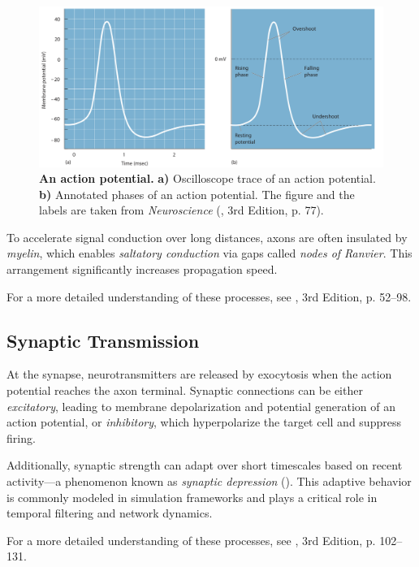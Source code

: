 \begin{figure}
    \centering
    \includegraphics[width=\linewidth]{img/action_potential.pdf}
    \caption{\textbf{An action potential.} \textbf{a)} Oscilloscope trace of an action potential. \textbf{b)} Annotated phases of an action potential. The figure and the labels are taken from \emph{Neuroscience} (\citet{bear2020neuroscience}, 3rd Edition, p. 77).}
    \label{fig:action_potential}
\end{figure}

To accelerate signal conduction over long distances, axons are often insulated by \emph{myelin}, which enables \emph{saltatory conduction} via gaps called \emph{nodes of Ranvier}. This arrangement significantly increases propagation speed. 

For a more detailed understanding of these processes, see \citet{bear2020neuroscience}, 3rd Edition, p. 52--98.

\subsection{Synaptic Transmission}
\label{subsec:synaptic_transmission}

At the synapse, neurotransmitters are released by exocytosis when the action potential reaches the axon terminal. Synaptic connections can be either \emph{excitatory}, leading to membrane depolarization and potential generation of an action potential, or \emph{inhibitory}, which hyperpolarize the target cell and suppress firing.

Additionally, synaptic strength can adapt over short timescales based on recent activity—a phenomenon known as \emph{synaptic depression} (\citet{abbott1997syndepression}). This adaptive behavior is commonly modeled in simulation frameworks and plays a critical role in temporal filtering and network dynamics.

For a more detailed understanding of these processes, see \citet{bear2020neuroscience}, 3rd Edition, p. 102--131.


